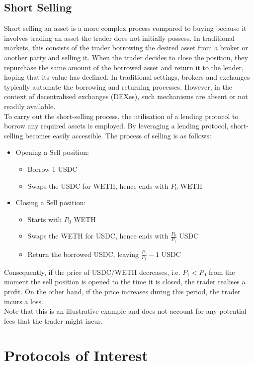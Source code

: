 \subsection{Short Selling}
Short selling an asset is a more complex process compared to buying because it involves trading an asset the trader does not initially possess. In traditional markets, this consists of the trader borrowing the desired asset from a broker or another party and selling it. When the trader decides to close the position, they repurchase the same amount of the borrowed asset and return it to the lender, hoping that its value has declined. In traditional settings, brokers and exchanges typically automate the borrowing and returning processes. However, in the context of decentralised exchanges (DEXes), such mechanisms are absent or not readily available.
\\[3mm]
To carry out the short-selling process, the utilisation of a lending protocol to borrow any required assets is employed. By leveraging a lending protocol, short-selling becomes easily accessible. The process of selling is as follows:
\begin{itemize}
    \item Opening a Sell position:\begin{itemize}
        \item Borrow 1 USDC
        \item Swaps the USDC for WETH, hence ends with $P_0$ WETH
    \end{itemize}
    \item Closing a Sell position:\begin{itemize}
        \item Starts with $P_0$ WETH
        \item Swaps the WETH for USDC, hence ends with $\frac{P_0}{P_1}$ USDC
        \item Return the borrowed USDC, leaving $\frac{P_0}{P_1} - 1$ USDC
    \end{itemize}
\end{itemize}
Consequently, if the price of USDC/WETH decreases, i.e. $P_1 < P_0$ from the moment the sell position is opened to the time it is closed, the trader realises a profit. On the other hand, if the price increases during this period, the trader incurs a loss.
\\[3mm]
Note that this is an illustrative example and does not account for any potential fees that the trader might incur.


\section{Protocols of Interest}
